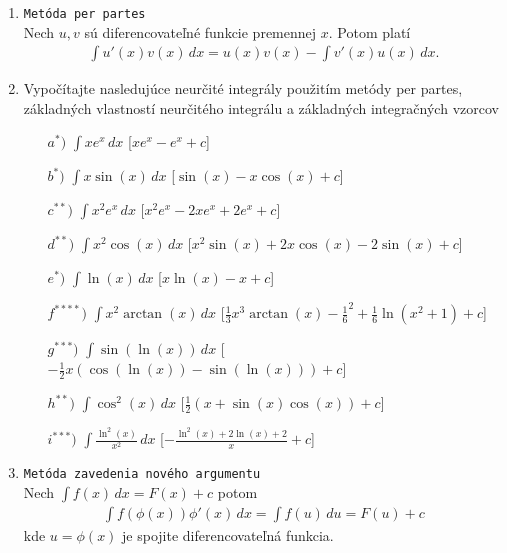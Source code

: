 \begin{enumerate}
\item \texttt{Metóda per partes} \\
Nech $u,v$ sú diferencovateľné funkcie premennej $x$. Potom platí
\begin{align*}
\int u'(x)v(x) \,dx=u(x)v(x)- \int v'(x)u(x) \,dx .
\end{align*}

\item Vypočítajte nasledujúce neurčité integrály použitím metódy per partes, základných vlastností neurčitého integrálu a základných integračných vzorcov
\begin{enumerate}
\item[$a^*)$]{$ \int xe^x \,dx$} \hspace{\fill} [$x e^x - e^x +c$]
\item[$b^*)$]{$ \int x\sin(x) \,dx$} \hspace{\fill} [$ \sin(x)- x \cos(x) +c$]
\item[$c^{**})$]{$ \int x^2 e^x \,dx$} \hspace{\fill} [$x^2 e^x -2x e^x+2e^x +c$]
\item[$d^{**})$]{$ \int x^2 \cos(x) \,dx$} \hspace{\fill} [$x^2 \sin (x) + 2 x \cos (x) - 2\sin (x) +c$]
\item[$e^{*})$]{$ \int \ln(x) \,dx$} \hspace{\fill} [$ x \ln (x)-x+c$]
\item[$f^{****})$]{$ \int x^2\arctan(x) \,dx$} \hspace{\fill} [$ \frac{1}{3}x^3\arctan(x)-\frac{1}{6}^2+\frac{1}{6}\ln(x^2+1)+c$]
\item[$g^{***})$]{$ \int \sin(\ln(x)) \,dx$} \hspace{\fill} [$-\frac{1}{2}x(\cos(\ln(x))-\sin(\ln(x))) +c$]
\item[$h^{**})$]{$\int  \cos^2(x) \,dx$} \hspace{\fill} [$ \frac{1}{2}(x+\sin(x)\cos(x))+c$]
\item[$i^{***})$]{$ \int \frac{\ln^2(x)}{x^2} \,dx$} \hspace{\fill} [$ -\frac{\ln^2(x)+2\ln(x)+2}{x}+c$]
\end{enumerate}


\item \texttt{Metóda zavedenia nového argumentu} \\
Nech $\int f(x) \, dx=F(x)+c$ potom
\begin{align*}
\int f(\phi(x))\phi'(x) \, dx=\int f(u) \, du = F(u) +c
\end{align*}
kde $u=\phi(x)$ je spojite diferencovateľná funkcia.


\end{enumerate}
